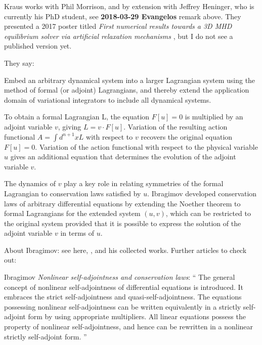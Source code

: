 \begin{description}
Kraus works with Phil Morrison, and by extension with Jeffrey Heninger, who
is currently his PhD student, see {\bf 2018-03-29 Evangelos} remark above.
They presented a 2017 poster titled {\em First numerical results towards a 3D
MHD equilibrium solver via artificial relaxation mechanisms }, but I do not
see a published version yet.

They say:

Embed an arbitrary dynamical system into a larger
Lagrangian system using the method of formal (or adjoint) Lagrangians, and
thereby extend the application domain of variational integrators to include
all dynamical systems.

To obtain a formal Lagrangian L, the equation $F [u] = 0$ is multiplied by an
adjoint variable $v$, giving $L = v \cdot F[u]$. Variation of the resulting
action functional $A = \int  d^{n+1}x L$ with respect to $v$ recovers the
original equation $F [u] = 0$. Variation of the action functional with
respect to the physical variable $u$ gives an additional equation that
determines the evolution of the adjoint variable $v$.

The dynamics of $v$ play a key role in relating symmetries of the formal
Lagrangian to conservation laws satisfied by $u$. Ibragimov developed conservation laws of arbitrary
differential equations by extending the Noether theorem to formal Lagrangians
for the extended system $(u, v)$, which can be restricted to the original
system provided that it is possible to express the solution of the adjoint
variable $v$ in terms of $u$.

About Ibragimov: see
{here},
, and his
{collected works}.
Further articles to check out:

Ibragimov
{\em Nonlinear self-adjointness and conservation laws}: ``
The general concept of nonlinear self-adjointness of differential
equations is introduced. It  embraces the strict self-adjointness
and quasi-self-adjointness. The equations possessing nonlinear
self-adjointness can be written equivalently in a strictly self-adjoint
form by using appropriate multipliers. All linear equations possess the
property of nonlinear self-adjointness, and hence can be rewritten in a
nonlinear strictly self-adjoint form.
''


\end{description}
